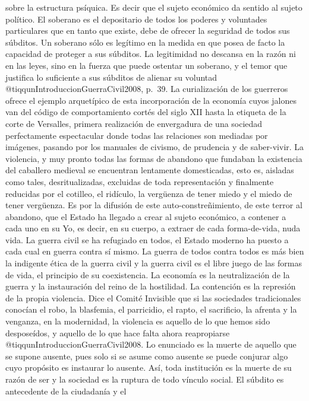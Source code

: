 \documentclass[
]{article}
\begin{document}
sobre la estructura psíquica. Es decir que el sujeto económico da
sentido al sujeto político. El soberano es el depositario de todos los
poderes y voluntades particulares que en tanto que existe, debe de
ofrecer la seguridad de todos sus súbditos. Un soberano sólo es legítimo
en la medida en que posea de facto la capacidad de proteger a sus
súbditos. La legitimidad no descansa en la razón ni en las leyes, sino
en la fuerza que puede ostentar un soberano, y el temor que justifica lo
suficiente a sus súbditos de alienar su voluntad
@tiqqunIntroduccionGuerraCivil2008, p.~39. La curialización de los
guerreros ofrece el ejemplo arquetípico de esta incorporación de la
economía cuyos jalones van del código de comportamiento cortés del siglo
XII hasta la etiqueta de la corte de Versalles, primera realización de
envergadura de una sociedad perfectamente espectacular donde todas las
relaciones son mediadas por imágenes, pasando por los manuales de
civismo, de prudencia y de saber-vivir. La violencia, y muy pronto todas
las formas de abandono que fundaban la existencia del caballero medieval
se encuentran lentamente domesticadas, esto es, aisladas como tales,
desritualizadas, excluidas de toda representación y finalmente reducidas
por el cotilleo, el ridículo, la vergüenza de tener miedo y el miedo de
tener vergüenza. Es por la difusión de este auto-constreñimiento, de
este terror al abandono, que el Estado ha llegado a crear al sujeto
económico, a contener a cada uno en su Yo, es decir, en su cuerpo, a
extraer de cada forma-de-vida, nuda vida. La guerra civil se ha
refugiado en todos, el Estado moderno ha puesto a cada cual en guerra
contra sí mismo. La guerra de todos contra todos es más bien la
indigente ética de la guerra civil y la guerra civil es el libre juego
de las formas de vida, el principio de su coexistencia. La economía es
la neutralización de la guerra y la instauración del reino de la
hostilidad. La contención es la represión de la propia violencia. Dice
el Comité Invisible que si las sociedades tradicionales conocían el
robo, la blasfemia, el parricidio, el rapto, el sacrificio, la afrenta y
la venganza, en la modernidad, la violencia es aquello de lo que hemos
sido desposeídos, y aquello de lo que hace falta ahora reapropiarse
@tiqqunIntroduccionGuerraCivil2008. Lo enunciado es la muerte de aquello
que se supone ausente, pues solo si se asume como ausente se puede
conjurar algo cuyo propósito es instaurar lo ausente. Así, toda
institución es la muerte de su razón de ser y la sociedad es la ruptura
de todo vínculo social. El súbdito es antecedente de la ciudadanía y el
\end{document}
